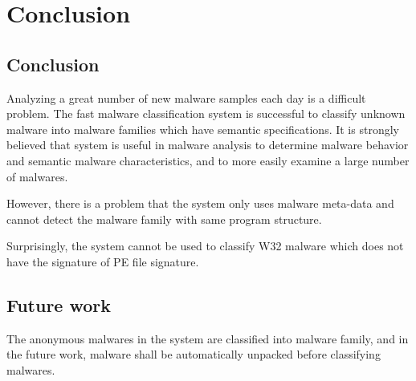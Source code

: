 
\chapter{Conclusion}\label{chap:7}
\section{Conclusion}
Analyzing a great number of new malware samples each day is a difficult problem. The fast malware classification system is successful to classify unknown malware into malware families which have semantic specifications. It is strongly believed that system is useful in malware analysis to determine malware behavior and semantic malware characteristics, and to more easily examine a large number of malwares.

However, there is a problem that the system only uses malware meta-data and cannot detect the malware family with same program structure.

Surprisingly, the system cannot be used to classify W32 malware which does not have the signature of PE file signature. 
 
\section{Future work}
The anonymous malwares in the system are classified into malware family, and in the future work, malware shall be automatically  unpacked before classifying malwares. 